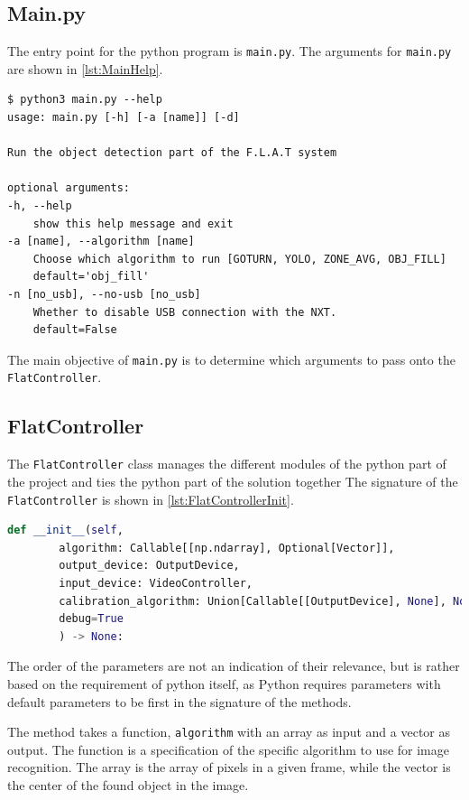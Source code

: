 \subsection{Main.py}
The entry point for the python program is \texttt{main.py}.
The arguments for \texttt{main.py}  are shown in \autoref{lst:MainHelp}.
\begin{lstlisting}[label={lst:MainHelp},caption={The help message of the commandline interface}]
$ python3 main.py --help
usage: main.py [-h] [-a [name]] [-d]

Run the object detection part of the F.L.A.T system

optional arguments:
-h, --help            
	show this help message and exit
-a [name], --algorithm [name] 
	Choose which algorithm to run [GOTURN, YOLO, ZONE_AVG, OBJ_FILL]
	default='obj_fill'
-n [no_usb], --no-usb [no_usb]
	Whether to disable USB connection with the NXT.
	default=False
\end{lstlisting}

The main objective of \texttt{main.py} is to determine which arguments to pass onto the \texttt{FlatController}.

\subsection{FlatController}\label{flatcontrollerimplementation}
The \texttt{FlatController} class manages the different modules of the python part of the project and ties the python part of the solution together
The signature of the \texttt{FlatController} is shown in \autoref{lst:FlatControllerInit}.

\begin{lstlisting}[language=Python,label={lst:FlatControllerInit},caption={Initialization method of the \texttt{FlatController} class}]
	def __init__(self,
		algorithm: Callable[[np.ndarray], Optional[Vector]],
		output_device: OutputDevice,
		input_device: VideoController,
		calibration_algorithm: Union[Callable[[OutputDevice], None], None] = None,
		debug=True
		) -> None:
\end{lstlisting}

The order of the parameters are not an indication of their relevance, but is rather based on the requirement of python itself, as Python requires parameters with default parameters to be first in the signature of the methods.

The method takes a function, \texttt{algorithm} with an array as input and a vector as output.
The function is a specification of the specific algorithm to use for image recognition.
The array is the array of pixels in a given frame, while the vector is the center of the found object in the image.

